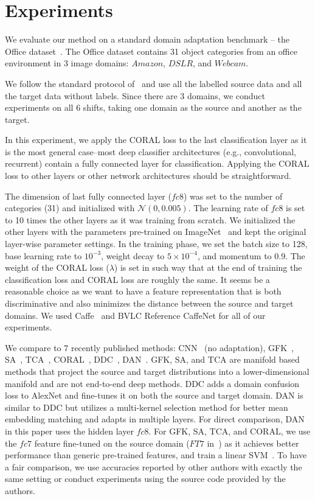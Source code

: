 \section{Experiments}
\label{sec:exp}

We evaluate our method on a standard domain adaptation benchmark -- the Office dataset~\cite{saenko2010adapting}. The Office dataset contains 31 object categories from an office environment in 3 image domains: $Amazon$, $DSLR$,  and $Webcam$. 

We follow the standard protocol of~\cite{gfk,dan_long15,decaf,tzeng_arxiv15,reversegrad} and use all the labelled source data and all the target data without labels. 
Since there are 3 domains, we conduct experiments on all 6 shifts, taking one domain as the source and another as the target. 

In this experiment, we apply the CORAL loss to the last classification layer
as it is the most general case--most deep classifier architectures (e.g., convolutional, recurrent) contain a fully connected layer for classification. Applying the CORAL loss to other layers or other network architectures should be straightforward. 

The dimension of last fully connected layer ($fc8$) was set to the number of categories (31) and initialized with $\mathcal{N}(0,0.005)$. The learning rate of $fc8$ is set to 10 times the other layers as it was training from scratch. We initialized the other layers with the parameters pre-trained on ImageNet~\cite{imagenet} and kept the original layer-wise parameter settings. In the training phase, we set the batch size to 128, base learning rate to $10^{-3}$, weight decay to $5\times10^{-4}$, and momentum to 0.9. The weight of the CORAL loss ($\lambda$) is set in such way that at the end of training the classification loss and CORAL loss are roughly the same. It seems be a reasonable choice as we want to have a feature representation that is both discriminative and also minimizes the distance between the source and target domains. We used Caffe~\cite{caffe} and BVLC Reference CaffeNet for all of our experiments.

We compare to 7 recently published methods: CNN~\cite{alexnet} (no adaptation), GFK~\cite{gfk}, SA~\cite{sa}, TCA~\cite{tca}, CORAL~\cite{coral}, DDC~\cite{tzeng_arxiv15}, DAN~\cite{dan_long15}. GFK, SA, and TCA are manifold based methods that project the source and target distributions into a lower-dimensional manifold and are not end-to-end deep methods. DDC adds a domain confusion loss to AlexNet and fine-tunes it on both the source and target domain. DAN is similar to DDC but utilizes a multi-kernel selection method for better mean embedding matching and adapts in multiple layers. For direct comparison, DAN in this paper uses the hidden layer $fc8$. For GFK, SA, TCA, and CORAL, we use the $fc7$ feature fine-tuned on the source domain ($FT7$ in~\cite{coral}) as it achieves better performance than generic pre-trained features, and train a linear SVM~\cite{sa,coral}. To have a fair comparison, we use accuracies reported by other authors with exactly the same setting or conduct experiments using the source code provided by the authors.


